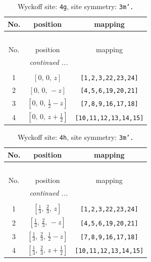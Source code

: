 \documentclass[fleqn,8pt]{jsarticle}
\begin{document}
\begin{longtable}{ccc}
\caption{Wyckoff site: {\tt 4g}, site symmetry: {\tt 3m'.}}
 \\
 \hline \hline
No. & position & mapping \\ \hline \endfirsthead

\multicolumn{2}{l}{\tablename\ \thetable{}} \\
 \hline \hline
No. & position & mapping \\ \hline \endhead

 \hline \hline
\multicolumn{2}{r}{\footnotesize\it continued ...} \\ \endfoot

 \hline \hline
\multicolumn{2}{r}{} \\ \endlastfoot

1 & $\left[ 0,\, 0,\, z \right]$ & {\tt [1,2,3,22,23,24]} \\ \hline
2 & $\left[ 0,\, 0,\, - z \right]$ & {\tt [4,5,6,19,20,21]} \\ \hline
3 & $\left[ 0,\, 0,\, \frac{1}{2} - z \right]$ & {\tt [7,8,9,16,17,18]} \\ \hline
4 & $\left[ 0,\, 0,\, z + \frac{1}{2} \right]$ & {\tt [10,11,12,13,14,15]} \\
\end{longtable}
\renewcommand{\arraystretch}{1.2}
\begin{longtable}{ccc}
\caption{Wyckoff site: {\tt 4h}, site symmetry: {\tt 3m'.}}
 \\
 \hline \hline
No. & position & mapping \\ \hline \endfirsthead

\multicolumn{2}{l}{\tablename\ \thetable{}} \\
 \hline \hline
No. & position & mapping \\ \hline \endhead

 \hline \hline
\multicolumn{2}{r}{\footnotesize\it continued ...} \\ \endfoot

 \hline \hline
\multicolumn{2}{r}{} \\ \endlastfoot

1 & $\left[ \frac{1}{3},\, \frac{2}{3},\, z \right]$ & {\tt [1,2,3,22,23,24]} \\ \hline
2 & $\left[ \frac{1}{3},\, \frac{2}{3},\, - z \right]$ & {\tt [4,5,6,19,20,21]} \\ \hline
3 & $\left[ \frac{1}{3},\, \frac{2}{3},\, \frac{1}{2} - z \right]$ & {\tt [7,8,9,16,17,18]} \\ \hline
4 & $\left[ \frac{1}{3},\, \frac{2}{3},\, z + \frac{1}{2} \right]$ & {\tt [10,11,12,13,14,15]} \\
\end{longtable}
\end{document}

